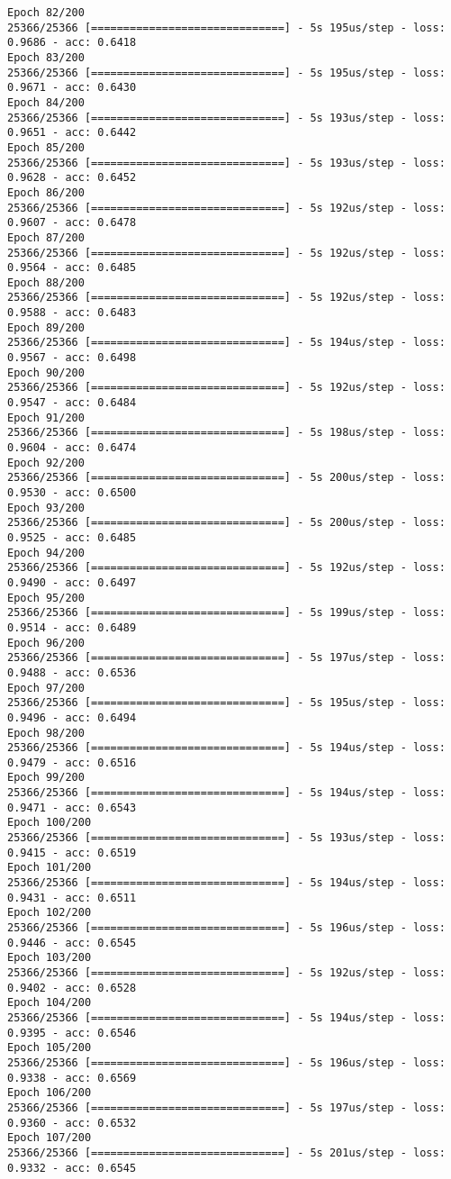 \documentclass[11pt]{article}
\begin{document}
\begin{Verbatim}[commandchars=\\\{\}]
Epoch 82/200
25366/25366 [==============================] - 5s 195us/step - loss: 0.9686 - acc: 0.6418
Epoch 83/200
25366/25366 [==============================] - 5s 195us/step - loss: 0.9671 - acc: 0.6430
Epoch 84/200
25366/25366 [==============================] - 5s 193us/step - loss: 0.9651 - acc: 0.6442
Epoch 85/200
25366/25366 [==============================] - 5s 193us/step - loss: 0.9628 - acc: 0.6452
Epoch 86/200
25366/25366 [==============================] - 5s 192us/step - loss: 0.9607 - acc: 0.6478
Epoch 87/200
25366/25366 [==============================] - 5s 192us/step - loss: 0.9564 - acc: 0.6485
Epoch 88/200
25366/25366 [==============================] - 5s 192us/step - loss: 0.9588 - acc: 0.6483
Epoch 89/200
25366/25366 [==============================] - 5s 194us/step - loss: 0.9567 - acc: 0.6498
Epoch 90/200
25366/25366 [==============================] - 5s 192us/step - loss: 0.9547 - acc: 0.6484
Epoch 91/200
25366/25366 [==============================] - 5s 198us/step - loss: 0.9604 - acc: 0.6474
Epoch 92/200
25366/25366 [==============================] - 5s 200us/step - loss: 0.9530 - acc: 0.6500
Epoch 93/200
25366/25366 [==============================] - 5s 200us/step - loss: 0.9525 - acc: 0.6485
Epoch 94/200
25366/25366 [==============================] - 5s 192us/step - loss: 0.9490 - acc: 0.6497
Epoch 95/200
25366/25366 [==============================] - 5s 199us/step - loss: 0.9514 - acc: 0.6489
Epoch 96/200
25366/25366 [==============================] - 5s 197us/step - loss: 0.9488 - acc: 0.6536
Epoch 97/200
25366/25366 [==============================] - 5s 195us/step - loss: 0.9496 - acc: 0.6494
Epoch 98/200
25366/25366 [==============================] - 5s 194us/step - loss: 0.9479 - acc: 0.6516
Epoch 99/200
25366/25366 [==============================] - 5s 194us/step - loss: 0.9471 - acc: 0.6543
Epoch 100/200
25366/25366 [==============================] - 5s 193us/step - loss: 0.9415 - acc: 0.6519
Epoch 101/200
25366/25366 [==============================] - 5s 194us/step - loss: 0.9431 - acc: 0.6511
Epoch 102/200
25366/25366 [==============================] - 5s 196us/step - loss: 0.9446 - acc: 0.6545
Epoch 103/200
25366/25366 [==============================] - 5s 192us/step - loss: 0.9402 - acc: 0.6528
Epoch 104/200
25366/25366 [==============================] - 5s 194us/step - loss: 0.9395 - acc: 0.6546
Epoch 105/200
25366/25366 [==============================] - 5s 196us/step - loss: 0.9338 - acc: 0.6569
Epoch 106/200
25366/25366 [==============================] - 5s 197us/step - loss: 0.9360 - acc: 0.6532
Epoch 107/200
25366/25366 [==============================] - 5s 201us/step - loss: 0.9332 - acc: 0.6545

\end{Verbatim}
\end{document}
